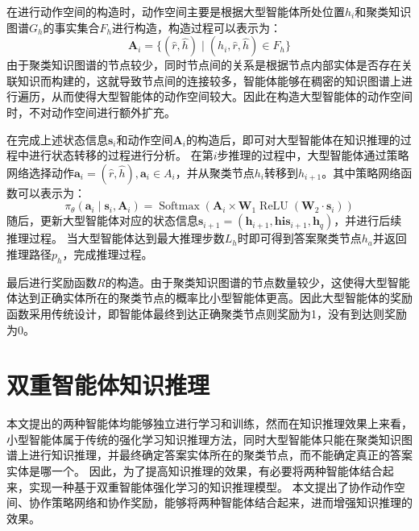 \documentclass[algorithmlist, AutoFakeBold, AutoFakeSlant, figurelist, tablelist, nomlist, engineering]{seuthesix}
\begin{document}
在进行动作空间的构造时，动作空间主要是根据大型智能体所处位置$h_i$和聚类知识图谱$G_h$的事实集合$F_h$进行构造，构造过程可以表示为：
\begin{equation}
  \bm{A}_i = \{(\hat{r}, \hat{h}) \mid (h_i, \hat{r}, \hat{h}) \in F_h\}
  \label{base_2}
\end{equation}
由于聚类知识图谱的节点较少，同时节点间的关系是根据节点内部实体是否存在关联知识而构建的，这就导致节点间的连接较多，智能体能够在稠密的知识图谱上进行遍历，从而使得大型智能体的动作空间较大。因此在构造大型智能体的动作空间时，不对动作空间进行额外扩充。

在完成上述状态信息$\bm{s}_i$和动作空间$\bm{A}_i$的构造后，即可对大型智能体在知识推理的过程中进行状态转移的过程进行分析。
在第$i$步推理的过程中，大型智能体通过策略网络选择动作$\bm{a}_i = (\hat{r}, \hat{h}), \bm{a}_i \in A_i$，并从聚类节点$h_i$转移到$h_{i+1}$。其中策略网络函数可以表示为：
\begin{equation}
  \pi_\theta\left(\bm{a}_i \mid \bm{s}_i, \bm{A}_i\right) =\operatorname{Softmax}\left(\bm{A}_i \times \mathbf{W}_1 \operatorname{ReLU}\left(\mathbf{W}_2 \cdot \bm{s}_i\right)\right)
\end{equation}
随后，更新大型智能体对应的状态信息$\bm{s}_{i+1} = (\bm{h}_{i+1}, \bm{his}_{i+1}, \bm{h}_q)$，并进行后续推理过程。
当大型智能体达到最大推理步数$L_h$时即可得到答案聚类节点$h_a$并返回推理路径$p_h$，完成推理过程。

最后进行奖励函数$R$的构造。由于聚类知识图谱的节点数量较少，这使得大型智能体达到正确实体所在的聚类节点的概率比小型智能体更高。因此大型智能体的奖励函数采用传统设计，即智能体最终到达正确聚类节点则奖励为1，没有到达则奖励为0。

\section{双重智能体知识推理}
本文提出的两种智能体均能够独立进行学习和训练，然而在知识推理效果上来看，小型智能体属于传统的强化学习知识推理方法，同时大型智能体只能在聚类知识图谱上进行知识推理，并最终确定答案实体所在的聚类节点，而不能确定真正的答案实体是哪一个。
因此，为了提高知识推理的效果，有必要将两种智能体结合起来，实现一种基于双重智能体强化学习的知识推理模型。
本文提出了协作动作空间、协作策略网络和协作奖励，能够将两种智能体结合起来，进而增强知识推理的效果。
\end{document}
